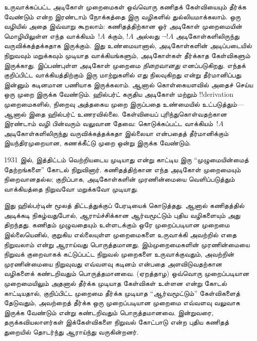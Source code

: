 \documentclass[../../../include/open-logic-section]{subfiles}
\begin{document}
உருவாக்கப்பட்ட அடிகோள் முறைமைகள் ஒவ்வொரு கணிதக் கேள்வியையும் தீர்க்க வேண்டும்
என்ற இரண்டாம் நோக்கத்தை இரு வழிகளில் துல்லியமாக்கலாம். ஒரு வழியில் அதை
இவ்வாறு கூறலாம்: கணிதத்திற்கான ஓர் அடிகோள் முறைமையின் மொழியிலுள்ள எந்த
வாக்கியம்~$!A$ க்கும், $!A$ அல்லது $\lnot !A$ அடிகோள்களிலிருந்து
வருவிக்கத்தக்கதாக இருக்கும். இது உண்மையானால், அடிகோள்களின் அடிப்படையில்
நிறுவவும் மறுக்கவும் முடியாத வாக்கியங்களும், அடிகோள்கள் தீர்க்காத கேள்விகளும்
இருக்காது. இப்பண்புள்ள அடிகோள் முறைமை \emph{நிறைவானது} எனப்படுகிறது. எந்தக்
குறிப்பிட்ட வாக்கியத்திற்கும் இரு மாற்றுகளில் எது நிலவுகிறது என்று
தீர்மானிப்பது இன்னும் கடினமான பணியாக இருக்கலாம். ஆனால் கொள்கையளவில் அதைச்
செய்ய ஒரு முறை இருக்க வேண்டும். ஹில்பர்ட் கருதிய அடிகோள் மற்றும்
!!{derivation} முறைமைகளில், நிறைவு அத்தகைய முறை இருப்பதை உண்மையில்
உட்படுத்தும்---ஆனால் இதை ஹில்பர்ட் உணரவில்லை. கேள்வியைப் புரிந்துகொள்வதற்கான
இரண்டாம் வழி பின்வரும் வலுவான தேவை: கொடுக்கப்பட்ட வாக்கியம்~$!A$ அடிகோள்களிலிருந்து
வருவிக்கத்தக்கதா இல்லையா என்பதைத் தீர்மானிக்கும் இயந்திரமுறையான, கணக்கீட்டு
முறை ஒன்று இருக்க வேண்டும்.

1931 இல், இத்திட்டம் வெற்றியடைய முடியாது என்று காட்டிய இரு
``முழுமையின்மைத் தேற்றங்களை'' கோடல் நிறுவினார். கணிதத்திற்கான எந்த அடிகோள்
முறைமையும் நிறைவானதல்ல; குறிப்பாக, அடிகோள்களின் முரணின்மையை வெளிப்படுத்தும்
வாக்கியத்தை நிறுவவோ மறுக்கவோ முடியாது.

இது ஹில்பர்டின் மூலத் திட்டத்துக்குப் பேரடியைக் கொடுத்தது. ஆனால் கணிதத்தில்
அடிக்கடி நிகழ்வதுபோல், ஆராய்ச்சிக்கான ஆர்வமூட்டும் புதிய வழிகளையும் அது
திறந்தது. கணிதம் முழுவதையும் உள்ளடக்கும் ஒரே முறைப்படியான முறைமை இல்லையெனில்,
குறுகிய எல்லையுள்ள முறைமைகளை உருவாக்கி அவற்றில் எதை நிறுவலாம் என்று
ஆராய்வது பொருத்தமானது. இம்முறைமைகளின் முரணின்மையை நிறுவக் குறைவாகக்
கட்டுப்பட்ட நிறுவல் முறைகளை உருவாக்குவதும், அவற்றின் முரணின்மையை நிறுவுவது
எவ்வளவு கடினம் என்பதை அளவிடுவதற்கான வழிகளைக் கண்டறிவதும் பொருத்தமானவை.
(ஏறத்தாழ) ஒவ்வொரு முறைப்படியான முறைமையிலும் அதனால் தீர்க்க முடியாத கேள்விகள்
உள்ளன என்று கோடல் காட்டியதால், குறிப்பிட்ட முறைமை தீர்க்க முடியாத
``ஆர்வமூட்டும்'' கேள்விகளைத் தேடுவதும், அவற்றைத் தீர்க்க ஒரு முறைப்படியான
முறைமை எவ்வளவு வலுவாக இருக்க வேண்டும் என்று கண்டறிவதும் பொருத்தமானவை.
இன்றுவரை, தருக்கவியலாளர்கள் இக்கேள்விகளை நிறுவல் கோட்பாடு என்ற புதிய கணிதத்
துறையில் தொடர்ந்து ஆராய்ந்து வருகின்றனர்.
\end{document}
